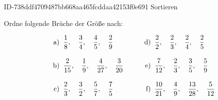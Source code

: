\begin{exercise}
      {ID-738ddf4709487bb668aa465fcddaa42153f0e691}
      {Sortieren}
  \ifproblem\problem\par
    Ordne folgende Brüche der Größe nach:
    \newcommand{\no}[1]
    {%
      \vphantom{\Bigg(}%
      \makebox[3em][r]%
      {%
        #1)%
      }%
      \;\;&%
    }%
    \begin{align*}
      \no{a} \frac{1}{8},\quad\frac{3}{4},\quad\frac{4}{5},\quad\frac{2}{9}      &
      \no{d} \frac{2}{2},\quad\frac{2}{3},\quad\frac{2}{4},\quad\frac{2}{5}      \\
      \no{b} \frac{2}{15},\quad\frac{1}{9},\quad\frac{4}{27},\quad\frac{3}{20}   &
      \no{e} \frac{7}{12},\quad\frac{2}{3},\quad\frac{3}{5},\quad\frac{5}{9}     \\
      \no{c} \frac{2}{3},\quad\frac{3}{2},\quad\frac{5}{7},\quad\frac{7}{5}      &
      \no{f} \frac{10}{21},\quad\frac{4}{9},\quad\frac{13}{28},\quad\frac{5}{12}
    \end{align*}
  \fi
\end{exercise}
